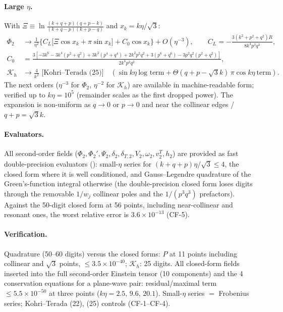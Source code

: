 {\paragraph{Large $\eta$.}
With $\Xi\equiv\ln\frac{(k+q+p)(q+p-k)}{(k+q-p)(k+p-q)}$ and $x_k=k\eta/\sqrt3$:
\begin{align*}
\Phi_2&\to\frac{1}{\eta^2}\Big\{C_L\big[\Xi\cos x_k+\pi\sin x_k\big]+C_0\cos x_k\Big\}+O(\eta^{-3}),\qquad C_L=-\frac{3(k^2+p^2+q^2)R}{8k^4p^3q^3},\\
C_0&=\frac{3\left[-3k^6-3k^4(p^2+q^2)+3k^2(p^4+q^4)+2k^2p^2q^2+3(p^6+q^6)-3p^2q^2(p^2+q^2)\right]}{2k^4p^2q^2},\\
\mathcal K_h&\to\frac{4}{k^2}\,\,\text{[Kohri--Terada (25)]}\quad(\sin k\eta\ \text{log term}+\Theta(q+p-\sqrt3k)\,\pi\cos k\eta\ \text{term}).
\end{align*}
The next orders ($\eta^{-3}$ for $\Phi_2$, $\eta^{-2}$ for $\mathcal K_h$) are available in machine-readable form; verified up to $k\eta=10^5$ (remainder
scales as the first dropped power). The expansion is non-uniform as $q\to0$ or $p\to0$ and near the collinear edges / $q+p=\sqrt3k$.


\paragraph{Evaluators.}  All second-order fields ($\Phi_2,\Phi_2',\Psi_2,\delta_2,\delta_{T,2},V_2,\omega_2,v^T_2,h_2$) are provided as fast
double-precision evaluators (): small-$\eta$ series for $(k+q+p)\eta/\sqrt3\le4$, the closed form where it is
well conditioned, and Gauss--Legendre quadrature of the Green's-function integral otherwise (the double-precision closed form loses digits through the
removable $1/w_j$ collinear poles and the $1/(p^3q^3)$ prefactors).  Against the 50-digit closed form at 56 points, including near-collinear and resonant
ones, the worst relative error is $3.6\times10^{-13}$ (CF-5).

\paragraph{Verification.}  Quadrature (50--60 digits) versus the closed forms: $P$ at 11 points including collinear and $\sqrt3$ points,
$\le3.5\times10^{-40}$; $\mathcal K_h$: 25 digits.  All closed-form fields inserted into the full second-order Einstein tensor (10 components) and
the 4 conservation equations for a plane-wave pair: residual/maximal term $\le5.5\times10^{-50}$ at three points ($k\eta=2.5,\,9.6,\,20.1$).  Small-$\eta$
series $=$ Frobenius series; Kohri--Terada (22), (25) controls (CF-1--CF-4).
\endgroup}
